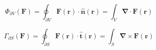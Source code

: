 \begin{theorem}
    \begin{equation}
        \Phi_{\partial V}(\mathbf{F}) = \oint_{\partial V} \mathbf{F}(\mathbf{r}) \cdot \mathbf{\hat{n}}(\mathbf{r}) = \int_V \mathbf{\nabla} \cdot \mathbf{F}(\mathbf{r})
    \end{equation}
\end{theorem}

\begin{theorem}
    \begin{equation}
        \Gamma_{\partial S}(\mathbf{F}) = \oint_{\partial S} \mathbf{F}(\mathbf{r}) \cdot \mathbf{\hat{t}}(\mathbf{r}) = \int_S \mathbf{\nabla} \times \mathbf{F}(\mathbf{r})
    \end{equation}
\end{theorem}

